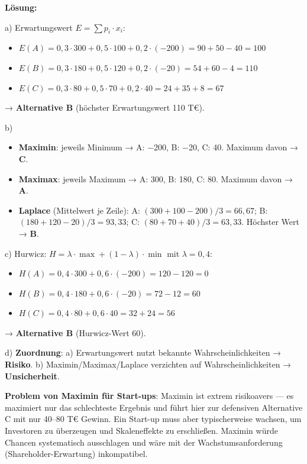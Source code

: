 \documentclass[11pt, a4paper]{article}
\begin{document}
\textbf{Lösung:}


a) Erwartungswert $E = \sum p_i \cdot x_i$:

\begin{itemize}
  \item $E(A) = 0{,}3 \cdot 300 + 0{,}5 \cdot 100 + 0{,}2 \cdot (-200) = 90 + 50 - 40 = 100$
  \item $E(B) = 0{,}3 \cdot 180 + 0{,}5 \cdot 120 + 0{,}2 \cdot (-20) = 54 + 60 - 4 = 110$
  \item $E(C) = 0{,}3 \cdot 80 + 0{,}5 \cdot 70 + 0{,}2 \cdot 40 = 24 + 35 + 8 = 67$
\end{itemize}

→ \textbf{Alternative B} (höchster Erwartungswert 110 T€).


b)

\begin{itemize}
  \item \textbf{Maximin}: jeweils Minimum → A: −200, B: −20, C: 40. Maximum davon → \textbf{C}.
  \item \textbf{Maximax}: jeweils Maximum → A: 300, B: 180, C: 80. Maximum davon → \textbf{A}.
  \item \textbf{Laplace} (Mittelwert je Zeile): A: $(300+100-200)/3 = 66{,}67$; B: $(180+120-20)/3 = 93{,}33$; C: $(80+70+40)/3 = 63{,}33$. Höchster Wert → \textbf{B}.
\end{itemize}

c) Hurwicz: $H = \lambda \cdot \max + (1-\lambda) \cdot \min$ mit $\lambda = 0{,}4$:

\begin{itemize}
  \item $H(A) = 0{,}4 \cdot 300 + 0{,}6 \cdot (-200) = 120 - 120 = 0$
  \item $H(B) = 0{,}4 \cdot 180 + 0{,}6 \cdot (-20) = 72 - 12 = 60$
  \item $H(C) = 0{,}4 \cdot 80 + 0{,}6 \cdot 40 = 32 + 24 = 56$
\end{itemize}

→ \textbf{Alternative B} (Hurwicz-Wert 60).


d) \textbf{Zuordnung}: a) Erwartungswert nutzt bekannte Wahrscheinlichkeiten → \textbf{Risiko}. b) Maximin/Maximax/Laplace verzichten auf Wahrscheinlichkeiten → \textbf{Unsicherheit}.


\textbf{Problem von Maximin für Start-ups}: Maximin ist extrem risikoavers — es maximiert nur das schlechteste Ergebnis und führt hier zur defensiven Alternative C mit nur 40–80 T€ Gewinn. Ein Start-up muss aber typischerweise wachsen, um Investoren zu überzeugen und Skaleneffekte zu erschließen. Maximin würde Chancen systematisch ausschlagen und wäre mit der Wachstumsanforderung (Shareholder-Erwartung) inkompatibel.
\end{document}

